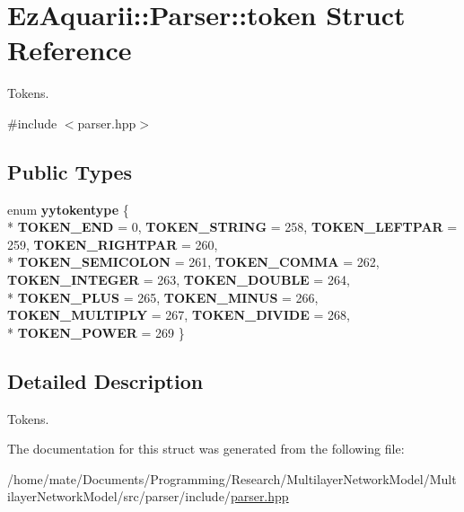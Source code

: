 \hypertarget{structEzAquarii_1_1Parser_1_1token}{}\section{Ez\+Aquarii\+:\+:Parser\+:\+:token Struct Reference}
\label{structEzAquarii_1_1Parser_1_1token}


Tokens.  




{\ttfamily \#include $<$parser.\+hpp$>$}

\subsection*{Public Types}
\begin{DoxyCompactItemize}
\item 
enum {\bfseries yytokentype} \{ \\*
{\bfseries T\+O\+K\+E\+N\+\_\+\+E\+ND} = 0, 
{\bfseries T\+O\+K\+E\+N\+\_\+\+S\+T\+R\+I\+NG} = 258, 
{\bfseries T\+O\+K\+E\+N\+\_\+\+L\+E\+F\+T\+P\+AR} = 259, 
{\bfseries T\+O\+K\+E\+N\+\_\+\+R\+I\+G\+H\+T\+P\+AR} = 260, 
\\*
{\bfseries T\+O\+K\+E\+N\+\_\+\+S\+E\+M\+I\+C\+O\+L\+ON} = 261, 
{\bfseries T\+O\+K\+E\+N\+\_\+\+C\+O\+M\+MA} = 262, 
{\bfseries T\+O\+K\+E\+N\+\_\+\+I\+N\+T\+E\+G\+ER} = 263, 
{\bfseries T\+O\+K\+E\+N\+\_\+\+D\+O\+U\+B\+LE} = 264, 
\\*
{\bfseries T\+O\+K\+E\+N\+\_\+\+P\+L\+US} = 265, 
{\bfseries T\+O\+K\+E\+N\+\_\+\+M\+I\+N\+US} = 266, 
{\bfseries T\+O\+K\+E\+N\+\_\+\+M\+U\+L\+T\+I\+P\+LY} = 267, 
{\bfseries T\+O\+K\+E\+N\+\_\+\+D\+I\+V\+I\+DE} = 268, 
\\*
{\bfseries T\+O\+K\+E\+N\+\_\+\+P\+O\+W\+ER} = 269
 \}\hypertarget{structEzAquarii_1_1Parser_1_1token_a2411b5b5510736b3c5e578685bf95fe1}{}\label{structEzAquarii_1_1Parser_1_1token_a2411b5b5510736b3c5e578685bf95fe1}

\end{DoxyCompactItemize}


\subsection{Detailed Description}
Tokens. 

The documentation for this struct was generated from the following file\+:\begin{DoxyCompactItemize}
\item 
/home/mate/\+Documents/\+Programming/\+Research/\+Multilayer\+Network\+Model/\+Multilayer\+Network\+Model/src/parser/include/\hyperlink{parser_8hpp}{parser.\+hpp}\end{DoxyCompactItemize}
